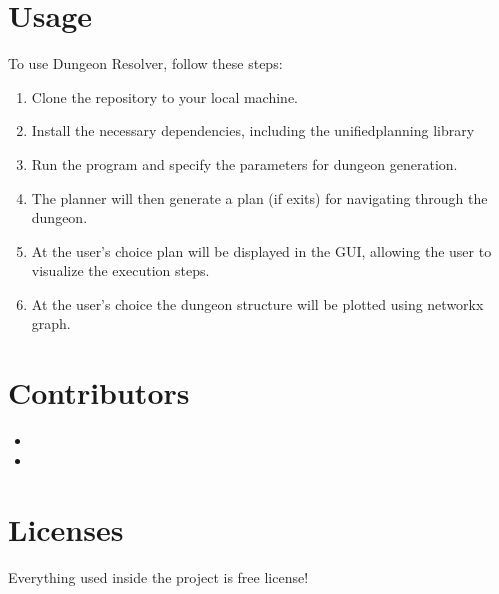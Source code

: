 \documentclass[letterpaper,10pt,english]{sphinxmanual}
\begin{document}
\section{Usage}
\label{\detokenize{index:usage}}
\sphinxAtStartPar
To use Dungeon Resolver, follow these steps:
\begin{enumerate}
%
\item {} 
\sphinxAtStartPar
Clone the repository to your local machine.

\item {} 
\sphinxAtStartPar
Install the necessary dependencies, including the unified\sphinxhyphen{}planning library

\item {} 
\sphinxAtStartPar
Run the program and specify the parameters for dungeon generation.

\item {} 
\sphinxAtStartPar
The planner will then generate a plan (if exits) for navigating through the dungeon.

\item {} 
\sphinxAtStartPar
At the user’s choice plan will be displayed in the GUI, allowing the user to visualize the execution steps.

\item {} 
\sphinxAtStartPar
At the user’s choice the dungeon structure will be plotted using networkx graph.

\end{enumerate}


\section{Contributors}
\label{\detokenize{index:contributors}}\begin{itemize}
\item {} 
\sphinxAtStartPar
{}

\item {} 
\sphinxAtStartPar
{}

\end{itemize}


\section{Licenses}
\label{\detokenize{index:licenses}}
\sphinxAtStartPar
Everything used inside the project is free license!
\end{document}
